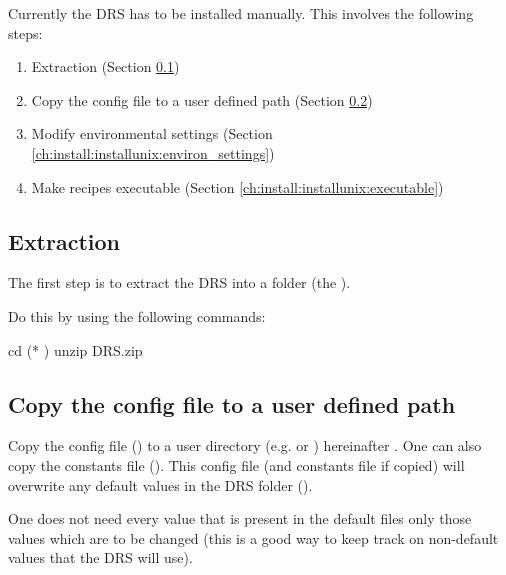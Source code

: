 Currently the DRS has to be installed manually. This involves the following steps:
\begin{enumerate}
\item Extraction (Section \ref{ch:install:installunix:extraction})
\item Copy the config file to a user defined path (Section \ref{ch:install:installunix:copy_config})
\item Modify environmental settings (Section \ref{ch:install:installunix:environ_settings})
\item Make recipes executable (Section \ref{ch:install:installunix:executable})
\end{enumerate}

\subsection{Extraction}
\label{ch:install:installunix:extraction}

The first step is to extract the DRS into a folder (the \InstallDIR).

\noindent Do this by using the following commands:
\begin{cmdbox}
cd (* \InstallDIR *)
unzip DRS.zip
\end{cmdbox}

\subsection{Copy the config file to a user defined path}
\label{ch:install:installunix:copy_config}
Copy the config file (\InstallDIR{}) to a user directory (e.g.  or ) hereinafter \userDIR. One can also copy the constants file (\constantsfile). This config file (and constants file if copied) will overwrite any default values in the DRS folder (\InstallDIR{}).

\begin{note}
One does not need every value that is present in the default files only those values which are to be changed (this is a good way to keep track on non-default values that the DRS will use).
\end{note}

